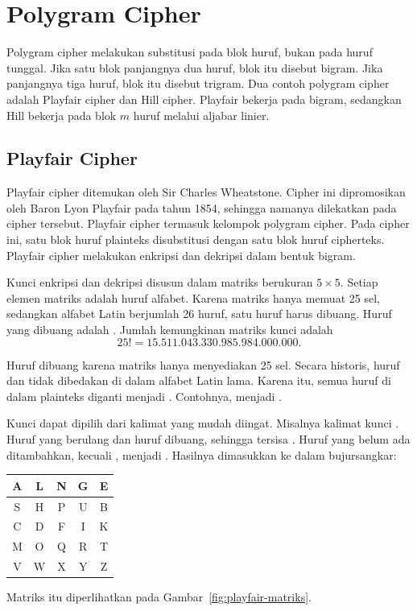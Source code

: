 \section{Polygram Cipher}
\label{sec:polygram}

Polygram cipher melakukan substitusi pada blok huruf, bukan pada huruf
tunggal. Jika satu blok panjangnya dua huruf, blok itu disebut bigram. Jika
panjangnya tiga huruf, blok itu disebut trigram. Dua contoh polygram cipher
adalah Playfair cipher dan Hill cipher. Playfair bekerja pada bigram,
sedangkan Hill bekerja pada blok $m$ huruf melalui aljabar linier.

\subsection{Playfair Cipher}
\label{sec:playfair}

Playfair cipher ditemukan oleh Sir Charles Wheatstone. Cipher ini
dipromosikan oleh Baron Lyon Playfair pada tahun 1854, sehingga namanya
dilekatkan pada cipher tersebut. Playfair cipher termasuk kelompok polygram
cipher. Pada cipher ini, satu blok huruf plainteks disubstitusi dengan satu
blok huruf cipherteks. Playfair cipher melakukan enkripsi dan dekripsi dalam
bentuk bigram.

Kunci enkripsi dan dekripsi disusun dalam matriks berukuran $5 \times 5$.
Setiap elemen matriks adalah huruf alfabet. Karena matriks hanya memuat 25
sel, sedangkan alfabet Latin berjumlah 26 huruf, satu huruf harus dibuang.
Huruf yang dibuang adalah . Jumlah kemungkinan matriks kunci adalah
\[
25! = 15.511.043.330.985.984.000.000.
\]

Huruf  dibuang karena matriks hanya menyediakan 25 sel. Secara
historis, huruf  dan  tidak dibedakan di dalam alfabet Latin
lama. Karena itu, semua huruf  di dalam plainteks diganti menjadi
. Contohnya,  menjadi .

Kunci dapat dipilih dari kalimat yang mudah diingat. Misalnya kalimat kunci
. Huruf yang berulang dan huruf  dibuang,
sehingga tersisa . Huruf yang belum ada ditambahkan, kecuali
, menjadi . Hasilnya dimasukkan ke
dalam bujursangkar:
\begin{center}
\begin{tabular}{|c|c|c|c|c|}
\hline
A & L & N & G & E \\
\hline
S & H & P & U & B \\
\hline
C & D & F & I & K \\
\hline
M & O & Q & R & T \\
\hline
V & W & X & Y & Z \\
\hline
\end{tabular}
\end{center}
Matriks itu diperlihatkan pada Gambar~\ref{fig:playfair-matriks}.

